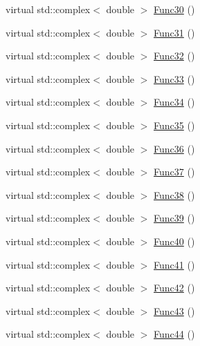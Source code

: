 \begin{DoxyCompactItemize}
\item 
virtual std\-::complex$<$ double $>$ \hyperlink{classosea_1_1ofreq_1_1_equationof_motion_a172d2920a71a1b24f467994f6fea8f99}{Func30} ()
\item 
virtual std\-::complex$<$ double $>$ \hyperlink{classosea_1_1ofreq_1_1_equationof_motion_a5b020264aabe3cdaf95c04e9e7ca1874}{Func31} ()
\item 
virtual std\-::complex$<$ double $>$ \hyperlink{classosea_1_1ofreq_1_1_equationof_motion_a240b245630cd6751721233de8560200a}{Func32} ()
\item 
virtual std\-::complex$<$ double $>$ \hyperlink{classosea_1_1ofreq_1_1_equationof_motion_a9f12298af512bf091c3b8a57c1e5f96c}{Func33} ()
\item 
virtual std\-::complex$<$ double $>$ \hyperlink{classosea_1_1ofreq_1_1_equationof_motion_aa162c47e961c0e3064bd0d57e5c60764}{Func34} ()
\item 
virtual std\-::complex$<$ double $>$ \hyperlink{classosea_1_1ofreq_1_1_equationof_motion_ac658169efe42c44bb5e14c5f9131478c}{Func35} ()
\item 
virtual std\-::complex$<$ double $>$ \hyperlink{classosea_1_1ofreq_1_1_equationof_motion_a51a0d7c4447833b5d26cf3624623bd33}{Func36} ()
\item 
virtual std\-::complex$<$ double $>$ \hyperlink{classosea_1_1ofreq_1_1_equationof_motion_a80f3f61eaded9b475fbb47aaf335183f}{Func37} ()
\item 
virtual std\-::complex$<$ double $>$ \hyperlink{classosea_1_1ofreq_1_1_equationof_motion_a01727a601ff0281f16591ef4d1b5bbf0}{Func38} ()
\item 
virtual std\-::complex$<$ double $>$ \hyperlink{classosea_1_1ofreq_1_1_equationof_motion_a5e986c0952ec3c25426bba62737633f1}{Func39} ()
\item 
virtual std\-::complex$<$ double $>$ \hyperlink{classosea_1_1ofreq_1_1_equationof_motion_aeefb90327b72c61c09a22d2bed6ebd60}{Func40} ()
\item 
virtual std\-::complex$<$ double $>$ \hyperlink{classosea_1_1ofreq_1_1_equationof_motion_af6ac5c3c8cfd7ae351693bb349d6f28a}{Func41} ()
\item 
virtual std\-::complex$<$ double $>$ \hyperlink{classosea_1_1ofreq_1_1_equationof_motion_a8a7b456c14cbbf5a284bc6438eedaec9}{Func42} ()
\item 
virtual std\-::complex$<$ double $>$ \hyperlink{classosea_1_1ofreq_1_1_equationof_motion_a9b70e7f90d34a774a4a19b77b759a7d5}{Func43} ()
\item 
virtual std\-::complex$<$ double $>$ \hyperlink{classosea_1_1ofreq_1_1_equationof_motion_aa85ed6fe8cee4a23ed82947b32aa8afd}{Func44} ()

\end{DoxyCompactItemize}
